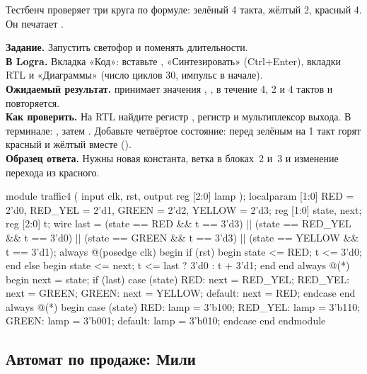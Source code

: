 Тестбенч  проверяет три круга по формуле:
зелёный 4 такта, жёлтый 2, красный 4. Он печатает .

\begin{diybox}
\textbf{Задание.} Запустить светофор и поменять длительности.\\
\textbf{В Logra.} Вкладка «Код»: вставьте , «Синтезировать»
(Ctrl+Enter), вкладки RTL и «Диаграммы» (число циклов 30, импульс  в
начале).\\
\textbf{Ожидаемый результат.}  принимает значения ,
,  в течение 4, 2 и 4 тактов и повторяется.\\
\textbf{Как проверить.} На RTL найдите регистр , регистр 
и мультиплексор выхода. В терминале:
, затем .
 Добавьте четвёртое состояние: перед зелёным на 1 такт горят красный и
жёлтый вместе ().\\
\textbf{Образец ответа.} Нужны новая константа, ветка в блоках~2 и~3 и
изменение перехода из красного.
\end{diybox}

\begin{vcode}
module traffic4 (
    input            clk, rst,
    output reg [2:0] lamp
);
    localparam [1:0] RED = 2'd0, RED_YEL = 2'd1, GREEN = 2'd2, YELLOW = 2'd3;
    reg [1:0] state, next;
    reg [2:0] t;
    wire last = (state == RED && t == 3'd3) || (state == RED_YEL && t == 3'd0)
             || (state == GREEN && t == 3'd3) || (state == YELLOW && t == 3'd1);
    always @(posedge clk) begin
        if (rst) begin state <= RED; t <= 3'd0; end
        else begin state <= next; t <= last ? 3'd0 : t + 3'd1; end
    end
    always @(*) begin
        next = state;
        if (last) case (state)
            RED:     next = RED_YEL;
            RED_YEL: next = GREEN;
            GREEN:   next = YELLOW;
            default: next = RED;
        endcase
    end
    always @(*) begin
        case (state)
            RED:     lamp = 3'b100;
            RED_YEL: lamp = 3'b110;
            GREEN:   lamp = 3'b001;
            default: lamp = 3'b010;
        endcase
    end
endmodule
\end{vcode}


\subsection{Автомат по продаже: Мили}

